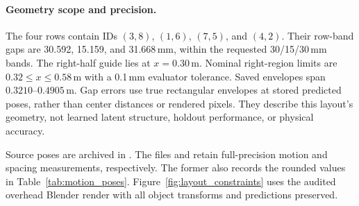 \paragraph{Geometry scope and precision.}
The four rows contain IDs $(3,8)$, $(1,6)$, $(7,5)$, and $(4,2)$. Their row-band gaps are 30.592, 15.159, and 31.668\,mm, within the requested 30/15/30\,mm bands. The right-half guide lies at $x=0.30$\,m. Nominal right-region limits are $0.32\leq x\leq0.58$\,m with a 0.1\,mm evaluator tolerance. Saved envelopes span $0.3210$--$0.4905$\,m. Gap errors use true rectangular envelopes at stored predicted poses, rather than center distances or rendered pixels. They describe this layout's geometry, not learned latent structure, holdout performance, or physical accuracy.

Source poses are archived in . The files  and  retain full-precision motion and spacing measurements, respectively. The former also records the rounded values in Table~\ref{tab:motion_poses}. Figure~\ref{fig:layout_constraints} uses the audited overhead Blender render with all object transforms and predictions preserved.
